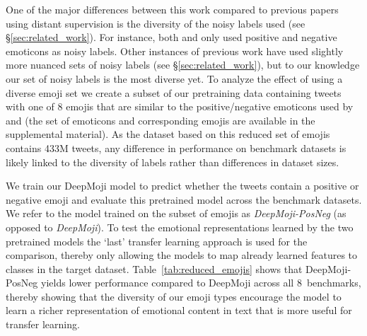 \documentclass[11pt,a4paper]{article}
\newcommand{\ndsets}{8}
\begin{document}
One of the major differences between this work compared to previous papers using distant supervision is the diversity of the noisy labels used (see \S\ref{sec:related_work}). For instance, both \citet{deriu2016swisscheese} and \citet{tang2014learning} only used positive and negative emoticons as noisy labels. Other instances of previous work have used slightly more nuanced sets of noisy labels (see \S\ref{sec:related_work}), but to our knowledge our set of noisy labels is the most diverse yet. To analyze the effect of using a diverse emoji set we create a subset of our pretraining data containing tweets with one of 8 emojis that are similar to the positive/negative emoticons used by~\citet{tang2014learning} and \citet{hu2013unsupervised} (the set of emoticons and corresponding emojis are available in the supplemental material). As the dataset based on this reduced set of emojis contains 433M tweets, any difference in performance on benchmark datasets is likely linked to the diversity of labels rather than differences in dataset sizes.

We train our DeepMoji model to predict whether the tweets contain a positive or negative emoji and evaluate this pretrained model across the benchmark datasets. We refer to the model trained on the subset of emojis as \textit{DeepMoji-PosNeg} (as opposed to \textit{DeepMoji}). To test the emotional representations learned by the two pretrained models the `last' transfer learning approach is used for the comparison, thereby only allowing the models to map already learned features to classes in the target dataset. Table~\ref{tab:reduced_emojis} shows that DeepMoji-PosNeg yields lower performance compared to DeepMoji across all \ndsets{}~benchmarks, thereby showing that the diversity of our emoji types encourage the model to learn a richer representation of emotional content in text that is more useful for transfer learning.
\end{document}
